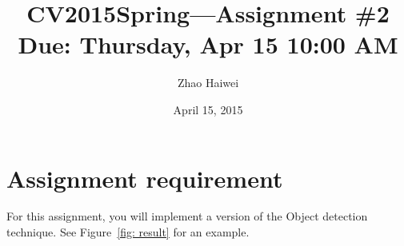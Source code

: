 \documentclass[12pt]{article}
\begin{document}
\title{\vspace{-2em}CV2015Spring---Assignment \#\textbf{2}\\
\normalsize{Due: Thursday, Apr 15 10:00 AM}}
\author{Zhao Haiwei}
\date{\vspace{-0.7em}April 15, 2015\vspace{-0.7em}}
\maketitle\thispagestyle{fancy}
\maketitle


\section{Assignment requirement}

For this assignment, you will implement a version of the Object detection technique. See Figure~\ref{fig: result} for an example.
\end{document}
